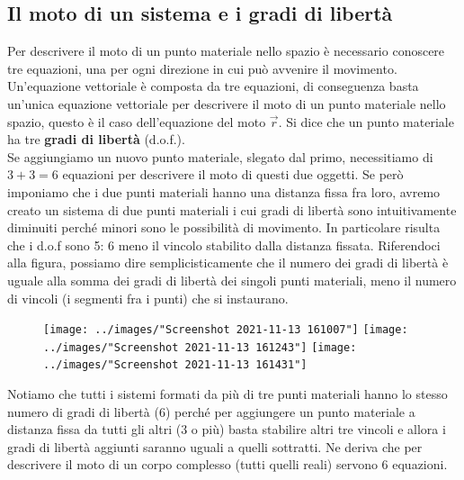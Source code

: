\subsection{Il moto di un sistema e i gradi di libertà}
Per descrivere il moto di un punto materiale nello spazio è necessario conoscere tre equazioni, una per ogni direzione in cui può avvenire il movimento. Un'equazione vettoriale è composta da tre equazioni, di conseguenza basta un'unica equazione vettoriale per descrivere il moto di un punto materiale nello spazio, questo è il caso dell'equazione del moto $\vec{r}$. Si dice che un punto materiale ha tre \textbf{gradi di libertà} (d.o.f.).\\
Se aggiungiamo un nuovo punto materiale, slegato dal primo, necessitiamo di $3+3=6$ equazioni per descrivere il moto di questi due oggetti. Se però imponiamo che i due punti materiali hanno una distanza fissa fra loro, avremo creato un sistema di due punti materiali i cui gradi di libertà sono intuitivamente diminuiti perché minori sono le possibilità di movimento. In particolare risulta che i d.o.f sono 5: 6 meno il vincolo stabilito dalla distanza fissata. Riferendoci alla figura, possiamo dire semplicisticamente che il numero dei gradi di libertà è uguale alla somma dei gradi di libertà dei singoli punti materiali, meno il numero di vincoli (i segmenti fra i punti) che si instaurano. \\

\begin{figure}[h]
	\centering
	\texttt{[image: ../images/"Screenshot 2021-11-13 161007"]}
	\texttt{[image: ../images/"Screenshot 2021-11-13 161243"]}
	\label{fig:screenshot-2021-11-13-161007}
	\texttt{[image: ../images/"Screenshot 2021-11-13 161431"]}
	\label{fig:screenshot-2021-11-13-161431}
\end{figure}\FloatBarrier
Notiamo che tutti i sistemi formati da più di tre punti materiali hanno lo stesso numero di gradi di libertà (6) perché per aggiungere un punto materiale a distanza fissa da tutti gli altri (3 o più) basta stabilire altri tre vincoli e allora i gradi di libertà aggiunti saranno uguali a quelli sottratti. Ne deriva che per descrivere il moto di un corpo complesso (tutti quelli reali) servono 6 equazioni.
